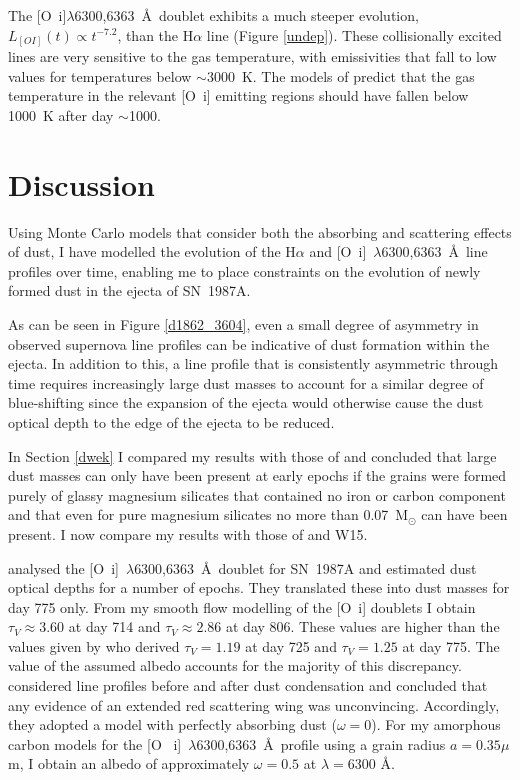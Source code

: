 The [O~{\sc i}]$\lambda$6300,6363~\AA\ doublet exhibits a much 
steeper evolution, $L_{[OI]}(t) \propto t^{-7.2}$, than the H$\alpha$ line 
(Figure \ref{undep}). These collisionally excited lines are very sensitive 
to the gas temperature, with emissivities that fall to low values for 
temperatures below $\sim$3000~K. The models of \citet{Li1992,Kozma1998a} 
predict that the gas temperature in the relevant [O~{\sc i}] emitting 
regions should have fallen below 1000~K after day $\sim$1000.





\section{Discussion}
\label{discuss}

Using Monte Carlo models that consider both the absorbing and scattering 
effects of dust, I have modelled the evolution of the H$\alpha$ and 
[O~{\sc i}]~$\lambda$6300,6363~\AA\ line profiles over time, enabling me 
to place constraints on the evolution of newly formed dust in the ejecta 
of SN~1987A.

As can be seen in Figure \ref{d1862_3604}, even a small degree of 
asymmetry in observed supernova line profiles can be indicative of dust 
formation within the ejecta.  In addition to this, a line profile that is 
consistently asymmetric through time requires increasingly large dust 
masses to account for a similar degree of blue-shifting since the 
expansion of the ejecta would otherwise cause the dust optical depth to 
the edge of the ejecta to be reduced.

In Section \ref{dwek} I compared my results with those of \citet{Dwek2015} and 
concluded that large dust masses can only have been present at early 
epochs if the grains were formed purely of glassy magnesium silicates that 
contained no iron or carbon component and that even for pure magnesium 
silicates no more than 0.07~M$_\odot$ can have been present. I now 
compare my results with those of \citet{Lucy1989} and W15.

\citet{Lucy1989} analysed the [O~{\sc i}]~$\lambda$6300,6363~\AA\ doublet 
for SN~1987A and estimated dust optical depths for a number of epochs. 
They translated these into dust masses for day 775 only. From my smooth 
flow modelling of the [O~{\sc i}] doublets I obtain $\tau_V \approx 3.60$ at day 
714 and $\tau_V \approx 2.86$ at day 806.  These values are higher 
than the values given by \citet{Lucy1989} who derived $\tau_V=1.19$ at day 
725 and $\tau_V=1.25$ at day 775.  The value of the assumed albedo 
accounts for the majority of this discrepancy.  \citet{Lucy1989} 
considered line profiles before and after dust condensation and concluded 
that any evidence of an extended red scattering wing was unconvincing.  
Accordingly, they adopted a model with perfectly absorbing dust ($\omega = 
0$).  For my amorphous carbon models for the [O~{\sc 
i}]~$\lambda$6300,6363~\AA\ profile using a grain radius $a=0.35\mu$m, I 
obtain an albedo of approximately $\omega = 0.5$ at $\lambda=6300$ \AA.


